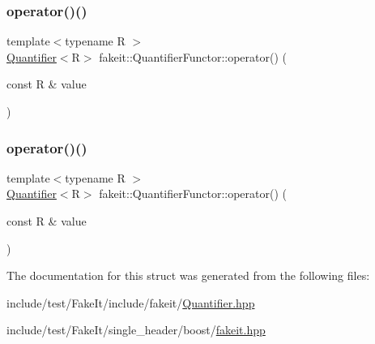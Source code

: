 \subsubsection{\texorpdfstring{operator()()}{operator()()}\hspace{0.1cm}{\footnotesize\ttfamily [8/9]}}
{\footnotesize\ttfamily template$<$typename R $>$ \\
\mbox{\hyperlink{structfakeit_1_1Quantifier}{Quantifier}}$<$R$>$ fakeit\+::\+Quantifier\+Functor\+::operator() (\begin{DoxyParamCaption}\item[{const R \&}]{value }\end{DoxyParamCaption})\hspace{0.3cm}{\ttfamily [inline]}}

\mbox{\label{structfakeit_1_1QuantifierFunctor_ae21e5262079b54f71eda7d3847967f06}} 
\subsubsection{\texorpdfstring{operator()()}{operator()()}\hspace{0.1cm}{\footnotesize\ttfamily [9/9]}}
{\footnotesize\ttfamily template$<$typename R $>$ \\
\mbox{\hyperlink{structfakeit_1_1Quantifier}{Quantifier}}$<$R$>$ fakeit\+::\+Quantifier\+Functor\+::operator() (\begin{DoxyParamCaption}\item[{const R \&}]{value }\end{DoxyParamCaption})\hspace{0.3cm}{\ttfamily [inline]}}



The documentation for this struct was generated from the following files\+:\begin{DoxyCompactItemize}
\item 
include/test/\+Fake\+It/include/fakeit/\mbox{\hyperlink{Quantifier_8hpp}{Quantifier.\+hpp}}\item 
include/test/\+Fake\+It/single\+\_\+header/boost/\mbox{\hyperlink{single__header_2boost_2fakeit_8hpp}{fakeit.\+hpp}}\end{DoxyCompactItemize}

